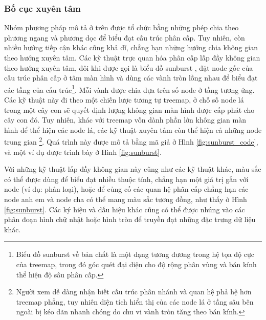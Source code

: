 \documentclass[12pt,a4paper, openany]{book}
\begin{document}
\FloatBarrier
\subsubsection{Bố cục xuyên tâm }

Nhóm phương pháp mô tả ở trên được tổ chức bằng những phép chia theo phương ngang và phương dọc để biểu đạt cấu trúc phân cấp. Tuy nhiên, còn nhiều hướng tiếp cận khác cũng khả dĩ, chẳng hạn những hướng chia không gian theo hướng xuyên tâm. Các kỹ thuật trực quan hóa phân cấp lấp đầy không gian theo hướng xuyên tâm, đôi khi được gọi là biểu đồ sunburst \cite{stasko2000}, đặt node gốc của cấu trúc phân cấp ở tâm màn hình và dùng các vành tròn lồng nhau để biểu đạt các tầng của cấu trúc\footnote{Biểu đồ sunburst về bản chất là một dạng tương đương trong hệ tọa độ cực của treemap, trong đó góc quét đại diện cho độ rộng phân vùng và bán kính thể hiện độ sâu phân cấp.}. Mỗi vành được chia dựa trên số node ở tầng tương ứng. Các kỹ thuật này đi theo một chiến lược tương tự treemap, ở chỗ số node lá trong một cây con sẽ quyết định lượng không gian màn hình được cấp phát cho cây con đó. Tuy nhiên, khác với treemap vốn dành phần lớn không gian màn hình để thể hiện các node lá, các kỹ thuật xuyên tâm còn thể hiện cả những node trung gian \footnote{Người xem dễ dàng nhận biết cấu trúc phân nhánh và quan hệ phả hệ hơn treemap phẳng, tuy nhiên diện tích hiển thị của các node lá ở tầng sâu bên ngoài bị kéo dãn nhanh chóng do chu vi vành tròn tăng theo bán kính.}. Quá trình này được mô tả bằng mã giả ở Hình \ref{fig:sunburst_code}, và một ví dụ được trình bày ở Hình \ref{fig:sunburst}.

Với những kỹ thuật lấp đầy không gian này cũng như các kỹ thuật khác, màu sắc có thể được dùng để biểu đạt nhiều thuộc tính, chẳng hạn một giá trị gắn với node (ví dụ: phân loại), hoặc để củng cố các quan hệ phân cấp chẳng hạn các node anh em và node cha có thể mang màu sắc tương đồng, như thấy ở Hình \ref{fig:sunburst}. Các ký hiệu và dấu hiệu khác cũng có thể được nhúng vào các phân đoạn hình chữ nhật hoặc hình tròn để truyền đạt những đặc trưng dữ liệu khác.
\end{document}
